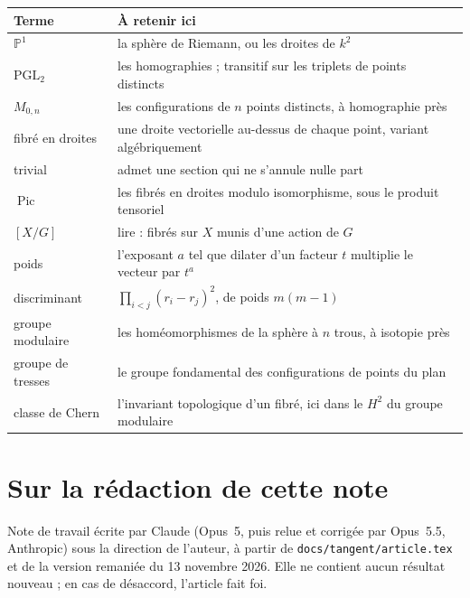 \documentclass[11pt,a4paper]{amsart}
\theoremstyle{definition}
\theoremstyle{plain}
\theoremstyle{remark}
\newcommand{\M}{M_{0,n}}
\newcommand{\Pic}{\operatorname{Pic}}
\newcommand{\PP}{\mathbb P^1}
\begin{document}
\begin{tabular}{@{}p{3.2cm}p{10.6cm}@{}}
\toprule
Terme & À retenir ici \\
\midrule
$\PP$ & la sphère de Riemann, ou les droites de $k^2$ \\
$\mathrm{PGL}_2$ & les homographies ; transitif sur les triplets de points distincts \\
$\M$ & les configurations de $n$ points distincts, à homographie près \\
fibré en droites & une droite vectorielle au-dessus de chaque point, variant algébriquement \\[2pt]
trivial & admet une section qui ne s'annule nulle part \\
$\Pic$ & les fibrés en droites modulo isomorphisme, sous le produit tensoriel \\
$[X/G]$ & lire : fibrés sur $X$ munis d'une action de $G$ \\
poids & l'exposant $a$ tel que dilater d'un facteur $t$ multiplie le vecteur par $t^a$ \\[2pt]
discriminant & $\prod_{i<j}(r_i-r_j)^2$, de poids $m(m-1)$ \\
groupe modulaire & les homéomorphismes de la sphère à $n$ trous, à isotopie près \\[2pt]
groupe de tresses & le groupe fondamental des configurations de points du plan \\
classe de Chern & l'invariant topologique d'un fibré, ici dans le $H^2$ du groupe modulaire \\
\bottomrule
\end{tabular}

\section*{Sur la rédaction de cette note}

Note de travail écrite par Claude (Opus~5, puis relue et corrigée par Opus~5.5, Anthropic) sous la direction de l'auteur, à partir de \texttt{docs/tangent/article.tex} et de la version remaniée du 13 novembre 2026. Elle ne contient aucun résultat nouveau ; en cas de désaccord, l'article fait foi.
\end{document}
